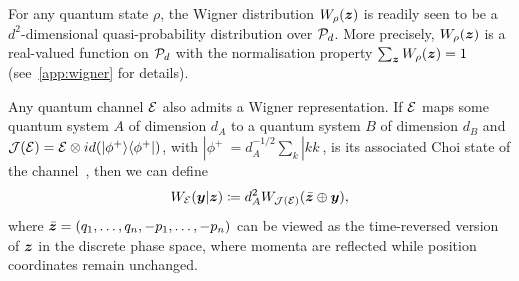 \documentclass[pra,
aps,
twocolumn,
superscriptaddress,
groupedaddress,
nofootinbib,
reprint
]{revtex4-1}
\begin{document}
For any quantum state $\rho$, the Wigner distribution $W_\rho(\bmz)$ is readily seen to be a $d^2$-dimensional quasi-probability distribution over $\cal{P}_d$. More precisely, $W_\rho(\bmz)$ is a real-valued function on $\P_d$ with the normalisation property $\sum_{\bmz} W_\rho(\bmz) = 1$ (see~\cref{app:wigner} for details).

Any quantum channel $\E$ also admits a Wigner representation. If $\E$ maps some quantum system $A$ of dimension $d_A$ to a quantum system $B$ of dimension $d_B$ and $\J(\E) = \E \otimes id (|\phi^+\> \<\phi^+|)$, with $|\phi^+\> = d_A^{-1/2} \sum_k |kk\>$, is its associated Choi state of the channel~\cite{watrous_2018}, then we can define
\begin{equation}\label{Wigner-Choi}
W_{\E}(\y |\bmz) \coloneqq d_A^2 W_{\J(\E)}(\bar{\bmz} \oplus \y),
\end{equation}
where $\bar{\bmz} = (q_1, \dots, q_n, -p_1, \dots, -p_n)$ can be viewed as the time-reversed version of $\bmz$ in the discrete phase space, where momenta are reflected while position coordinates remain unchanged.
\end{document}
